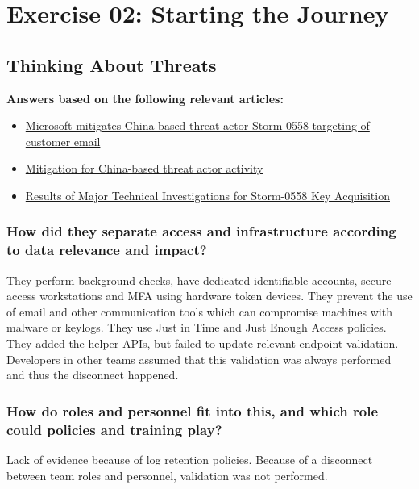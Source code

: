 \section*{Exercise 02: Starting the Journey}
\subsection*{Thinking About Threats}
\textbf{Answers based on the following relevant articles:}\\
\begin{itemize}
    \item \href{https://msrc.microsoft.com/blog/2023/07/microsoft-mitigates-china-based-threat-actor-storm-0558-targeting-of-customer-email/}{Microsoft mitigates China-based threat actor Storm-0558 targeting of customer email}
    \item \href{https://blogs.microsoft.com/on-the-issues/2023/07/11/mitigation-china-based-threat-actor/}{Mitigation for China-based threat actor activity}
    \item \href{https://msrc.microsoft.com/blog/2023/09/results-of-major-technical-investigations-for-storm-0558-key-acquisition/}{Results of Major Technical Investigations for Storm-0558 Key Acquisition}
\end{itemize}


\subsubsection*{How did they separate access and infrastructure according to data relevance and impact?}
They perform background checks, have dedicated identifiable accounts, secure access workstations and MFA using hardware token devices. They prevent the use of email and other communication tools which can compromise machines with malware or keylogs. They use Just in Time and Just Enough Access policies. They added the helper APIs, but failed to update relevant endpoint validation. Developers in other teams assumed that this validation was always performed and thus the disconnect happened.

\subsubsection*{How do roles and personnel fit into this, and which role could policies and training play?}
Lack of evidence because of log retention policies. Because of a disconnect between team roles and personnel, validation was not performed.

